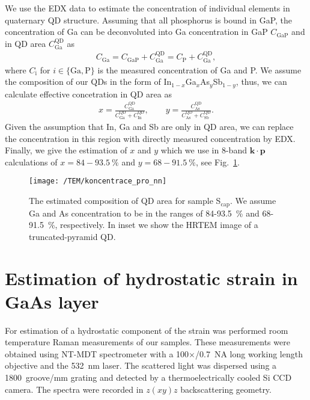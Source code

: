 We use the EDX data to estimate the concentration of individual elements in quaternary QD structure. Assuming that all phosphorus is bound in GaP, the concentration of Ga can be deconvoluted into Ga concentration in GaP $C_\mathrm{GaP}$ and in QD area $C_\mathrm{Ga}^\mathrm{QD}$ as
%
\begin{eqnarray}
C_\mathrm{Ga}=C_\mathrm{GaP}+C_\mathrm{Ga}^\mathrm{QD}=C_\mathrm{P}+C_\mathrm{Ga}^\mathrm{QD},
\end{eqnarray}
%
where $C_\mathrm{i}$ for $i \in \{\mathrm{Ga}, \mathrm{P}\}$ is the measured concentration of Ga and P. We assume the composition of our QDs in the form of In$_{1-x}$Ga$_{x}$As$_y$Sb$_{1-y}$, thus, we can calculate effective concetration in QD area as
%
\begin{eqnarray}
x=\frac{C_\mathrm{Ga}^\mathrm{QD}}{C_\mathrm{Ga}^\mathrm{QD}+C_\mathrm{In}^\mathrm{QD}},\qquad
y=\frac{C_\mathrm{As}^\mathrm{QD}}{C_\mathrm{As}^\mathrm{QD}+C_\mathrm{Sb}^\mathrm{QD}}.
\end{eqnarray}
%
Given the assumption that In, Ga and Sb are only in QD area, we can replace the concentration in this region with directly measured concentration by EDX. Finally, we give the estimation of $x$ and $y$ which we use in 8-band $\mathbf{k\cdot p}$ calculations of $x=84-93.5~\%$ and $y=68-91.5~\%$, see Fig.~\ref{fig:concentration_estimation}.


\begin{figure}
	\centering
	\texttt{[image: /TEM/koncentrace\_pro\_nn]} %
	\caption{The estimated composition of QD area for sample S$_\mathrm{cap}$. We assume Ga and As concentration to be in the ranges of 84-93.5~\% and 68-91.5~\%, respectively. In inset we show the HRTEM image of a truncated-pyramid QD.}
	\label{fig:concentration_estimation}
\end{figure}

\clearpage

\section{Estimation of hydrostatic strain in GaAs layer}
For estimation of a hydrostatic component of the strain was performed room temperature Raman measurements of our samples. These measurements were obtained using NT-MDT spectrometer with a 100$\times$/0.7~NA long working length objective and the 532~nm laser. The scattered light was dispersed using a 1800~groove/mm grating and detected by a thermoelectrically cooled Si CCD camera. The spectra were recorded in $z(xy)z$ backscattering geometry.

